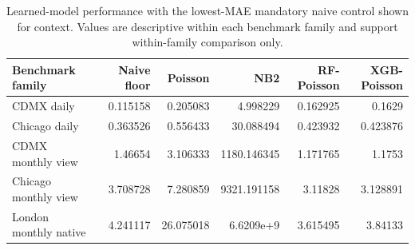 \begin{table}[!t]
\centering
\caption{Learned-model performance with the lowest-MAE mandatory naive control shown for context. Values are descriptive within each benchmark family and support within-family comparison only.}
\label{tab:art01-local-performance}
\scriptsize
\begin{tabular}{lrrrrr}
\toprule
Benchmark family & Naive floor & Poisson & NB2 & RF-Poisson & XGB-Poisson \\
\midrule
CDMX daily & 0.115158 & 0.205083 & 4.998229 & 0.162925 & 0.1629 \\
Chicago daily & 0.363526 & 0.556433 & 30.088494 & 0.423932 & 0.423876 \\
CDMX monthly view & 1.46654 & 3.106333 & 1180.146345 & 1.171765 & 1.1753 \\
Chicago monthly view & 3.708728 & 7.280859 & 9321.191158 & 3.11828 & 3.128891 \\
London monthly native & 4.241117 & 26.075018 & 6.6209e+9 & 3.615495 & 3.84133 \\
\bottomrule
\end{tabular}
\end{table}
